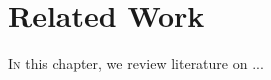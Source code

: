 \chapter{Related Work}
\label{chap:related}

\vspace*{-2.2em}
\minitoc
\vspace*{0.8em}

\lettrine[lines=3]{I}{n} this chapter, we review literature on ...